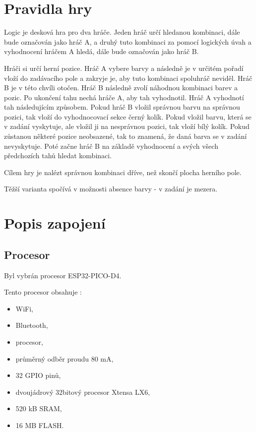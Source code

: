 \chapter{Pravidla hry}
Logic je desková hra pro dva hráče. Jeden hráč určí hledanou kombinaci, dále bude označován jako hráč A, a druhý tuto kombinaci za pomocí logických úvah a
vyhodnocení hráčem A hledá, dále bude označován jako hráč B.

Hráči si určí herní pozice. Hráč A vybere barvy a následně je v určitém pořadí vloží do zadávacího pole a zakryje je, aby tuto
kombinaci spoluhráč neviděl. Hráč B je v této chvíli otočen. Hráč B následně zvolí náhodnou kombinaci barev a pozic. Po ukončení tahu nechá
hráče A, aby tah vyhodnotil. Hráč A vyhodnotí tah následujícím způsobem. Pokud hráč B vložil správnou barvu na správnou pozici, tak vloží 
do vyhodnocovací sekce černý kolík. Pokud vložil barvu, která se v zadání vyskytuje, ale vložil ji na nesprávnou pozici, tak vloží bílý kolík.
Pokud zůstanou některé pozice neobsazené, tak to znamená, že daná barva se v zadání nevyskytuje. Poté začne hráč B na základě vyhodnocení a 
svých všech předchozích tahů hledat kombinaci.

Cílem hry je nalézt správnou kombinaci dříve, než skončí plocha herního pole.

Těžší varianta spočívá v možnosti absence barvy - v zadání je mezera.

\chapter{Popis zapojení}

\section{Procesor}
Byl vybrán procesor ESP32-PICO-D4.

Tento procesor obsahuje \cite{PICO_datasheet}: %
\begin{itemize}
    \item WiFi,
    \item Bluetooth,
    \item procesor,
    \item průměrný odběr proudu 80 mA,
    \item 32 GPIO pinů,
    \item dvoujádrový 32bitový procesor Xtensa LX6,
    \item 520 kB SRAM, %
    \item 16 MB FLASH. %
  \end{itemize}

